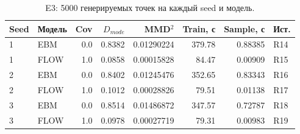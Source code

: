 \begin{table}[H]\centering\footnotesize
\setlength{\tabcolsep}{4pt}
\caption{E3: 5000 генерируемых точек на каждый seed и модель.}\label{tab:models}
\begin{tabular}{llrrrrrl}
\toprule
Seed & Модель & Cov & $D_{mode}$ & MMD$^2$ & Train, с & Sample, с & Ист. \\
\midrule
1 & EBM & 0.0 & 0.8382 & 0.01290224 & 379.78 & 0.88385 & R14 \\
1 & FLOW & 1.0 & 0.0858 & 0.00015828 & 84.47 & 0.00909 & R15 \\
2 & EBM & 0.0 & 0.8402 & 0.01245476 & 352.65 & 0.83343 & R16 \\
2 & FLOW & 1.0 & 0.1012 & 0.00028826 & 79.51 & 0.01138 & R17 \\
3 & EBM & 0.0 & 0.8514 & 0.01486872 & 347.57 & 0.72787 & R18 \\
3 & FLOW & 1.0 & 0.0978 & 0.00027719 & 79.31 & 0.00983 & R19 \\
\bottomrule
\end{tabular}
\end{table}
